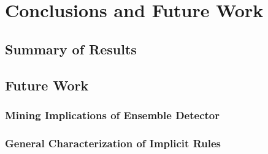 \chapter{Conclusions and Future Work}
\label{sec:conclusoecvcs}

\section{Summary of Results}
\section{Future Work}
\subsection{Mining Implications of Ensemble Detector}
\subsection{General Characterization of Implicit Rules}

\lipsum[4]
